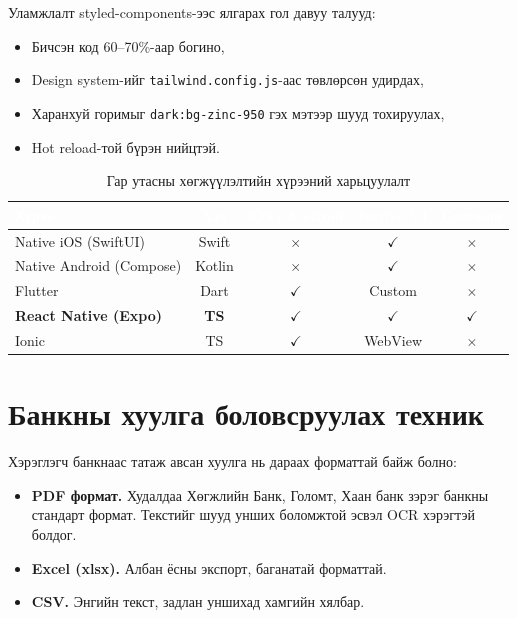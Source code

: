 Уламжлалт styled-components-ээс ялгарах гол давуу талууд:
\begin{itemize}
    \item Бичсэн код 60--70\%-аар богино,
    \item Design system-ийг \texttt{tailwind.config.js}-аас төвлөрсөн удирдах,
    \item Харанхуй горимыг \texttt{dark:bg-zinc-950} гэх мэтээр шууд тохируулах,
    \item Hot reload-той бүрэн нийцтэй.
\end{itemize}

\begin{table}[ht]
\centering
\footnotesize
\renewcommand{\arraystretch}{1.25}
\begin{tabular}{|l|c|c|c|c|}
\hline
\rowcolor{darknavy}
\textcolor{white}{\textbf{Хүрээ}} & \textcolor{white}{\textbf{Хэл}} & \textcolor{white}{\textbf{iOS+Android}} & \textcolor{white}{\textbf{Native UI}} & \textcolor{white}{\textbf{Сонгосон}} \\ \hline
Native iOS (SwiftUI)  & Swift      & $\times$ & $\checkmark$ & $\times$ \\ \hline
Native Android (Compose) & Kotlin  & $\times$ & $\checkmark$ & $\times$ \\ \hline
Flutter               & Dart       & $\checkmark$ & Custom        & $\times$ \\ \hline
\textbf{React Native (Expo)} & \textbf{TS} & $\checkmark$ & $\checkmark$ & $\checkmark$ \\ \hline
Ionic                 & TS         & $\checkmark$ & WebView      & $\times$ \\ \hline
\end{tabular}
\caption{Гар утасны хөгжүүлэлтийн хүрээний харьцуулалт}
\label{tab:fe-cmp}
\end{table}

\section{Банкны хуулга боловсруулах техник}
Хэрэглэгч банкнаас татаж авсан хуулга нь дараах форматтай байж болно:
\begin{itemize}
    \item \textbf{PDF формат.} Худалдаа Хөгжлийн Банк, Голомт, Хаан банк зэрэг банкны стандарт формат. Текстийг шууд унших боломжтой эсвэл OCR хэрэгтэй болдог.
    \item \textbf{Excel (xlsx).} Албан ёсны экспорт, баганатай форматтай.
    \item \textbf{CSV.} Энгийн текст, задлан уншихад хамгийн хялбар.
\end{itemize}

